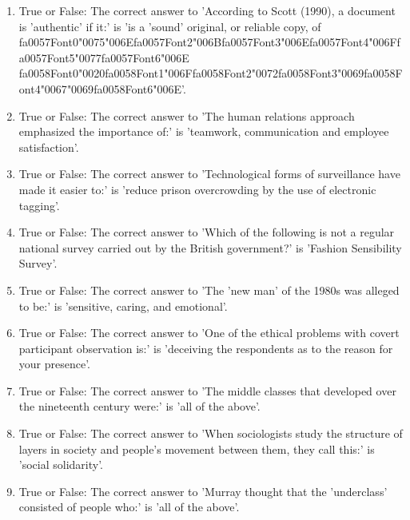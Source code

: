 \documentclass[12pt]{article}
\begin{document}
\begin{enumerate}[label=\arabic*.]
\item True or False: The correct answer to 'According to Scott (1990), a document is 'authentic' if it:' is 'is a 'sound' original, or reliable copy, of {\csname fa0057Font0\endcsname\char"0075}{\char"006E}{\csname fa0057Font2\endcsname\char"006B}{\csname fa0057Font3\endcsname\char"006E}{\csname fa0057Font4\endcsname\char"006F}{\csname fa0057Font5\endcsname\char"0077}{\csname fa0057Font6\endcsname\char"006E} {\csname fa0058Font0\endcsname\char"0020}{\csname fa0058Font1\endcsname\char"006F}{\csname fa0058Font2\endcsname\char"0072}{\csname fa0058Font3\endcsname\char"0069}{\csname fa0058Font4\endcsname\char"0067}{\char"0069}{\csname fa0058Font6\endcsname\char"006E}'.
\item True or False: The correct answer to 'The human relations approach emphasized the importance of:' is 'teamwork, communication and employee satisfaction'.
\item True or False: The correct answer to 'Technological forms of surveillance have made it easier to:' is 'reduce prison overcrowding by the use of electronic tagging'.
\item True or False: The correct answer to 'Which of the following is not a regular national survey carried out by the British government?' is 'Fashion Sensibility Survey'.
\item True or False: The correct answer to 'The 'new man' of the 1980s was alleged to be:' is 'sensitive, caring, and emotional'.
\item True or False: The correct answer to 'One of the ethical problems with covert participant observation is:' is 'deceiving the respondents as to the reason for your presence'.
\item True or False: The correct answer to 'The middle classes that developed over the nineteenth century were:' is 'all of the above'.
\item True or False: The correct answer to 'When sociologists study the structure of layers in society and people's movement between them, they call this:' is 'social solidarity'.
\item True or False: The correct answer to 'Murray thought that the 'underclass' consisted of people who:' is 'all of the above'.
\end{enumerate}
\end{document}
